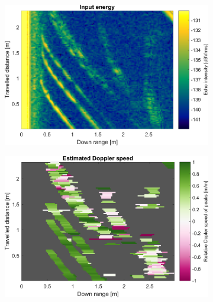 \begin{figure}[htbp]
    \centering
    \begin{subfigure}[t]{0.475\linewidth}
        \centering
        \includegraphics[width=\linewidth,max height=.475\textheight]{gfx/results/entryway_input.png}
    \end{subfigure}%
    \hfill%
    \begin{subfigure}[t]{0.475\linewidth}
        \centering
        \includegraphics[width=\linewidth,max height=.475\textheight]{gfx/results/entryway_doppler.png}
    \end{subfigure}\bigskip\\
    \begin{subfigure}[t]{0.5\linewidth}
        \centering

\end{subfigure}
\end{figure}
